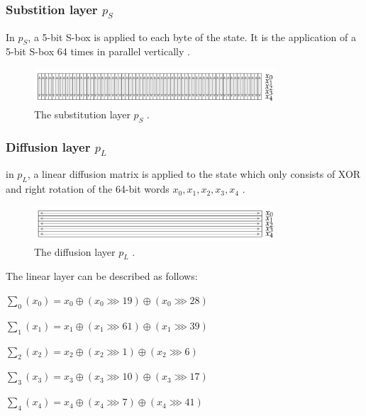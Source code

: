\subsubsection{Substition layer $p_S$}
In $p_S$, a 5-bit S-box is applied to each byte of the state. It is the application of a 5-bit S-box 64 times in parallel vertically \cite{ascon_specification, analysis_of_ascon}.

\begin{figure}[htbp]
  \centering
  \includegraphics[width=0.8\textwidth]{images/substitution.png}
  \caption{The substitution layer $p_S$ \cite{DBLP:journals/joc/DobraunigEMS21}.}
  \label{fig:substition}
\end{figure}

\subsubsection{Diffusion layer $p_L$}
in $p_L$, a linear diffusion matrix is applied to the state which only consists of XOR and right rotation of the 64-bit words $x_0, x_1, x_2, x_3, x_4$ \cite{ascon_specification, analysis_of_ascon}.

\begin{figure}[htbp]
  \centering
  \includegraphics[width=0.8\textwidth]{images/diffusion.png}
  \caption{The diffusion layer $p_L$ \cite{DBLP:journals/joc/DobraunigEMS21}.}
  \label{fig:diffusion}
\end{figure}

The linear layer can be described as follows:


$\sum_0 (x_0) = x_0 \oplus (x_0 \ggg 19) \oplus (x_0 \ggg 28)$

$\sum_1 (x_1) = x_1 \oplus (x_1 \ggg 61) \oplus (x_1 \ggg 39)$

$\sum_2 (x_2) = x_2 \oplus (x_2 \ggg 1) \oplus (x_2 \ggg 6)$

$\sum_3 (x_3) = x_3 \oplus (x_3 \ggg 10) \oplus (x_3 \ggg 17)$

$\sum_4 (x_4) = x_4 \oplus (x_4 \ggg 7) \oplus (x_4 \ggg 41)$ 

\cite{ascon_specification,analysis_of_ascon}


